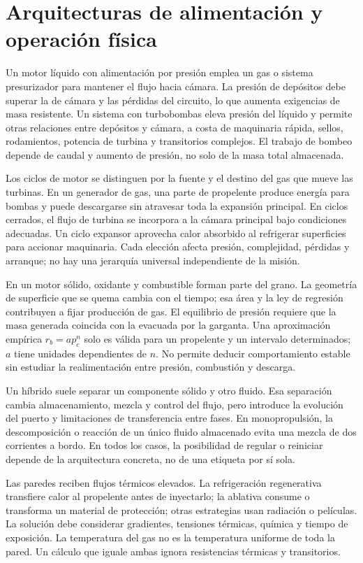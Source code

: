 \section{Arquitecturas de alimentación y operación física}
Un motor líquido con alimentación por presión emplea un gas o sistema presurizador para mantener el flujo hacia cámara. La presión de depósitos debe superar la de cámara y las pérdidas del circuito, lo que aumenta exigencias de masa resistente. Un sistema con turbobombas eleva presión del líquido y permite otras relaciones entre depósitos y cámara, a costa de maquinaria rápida, sellos, rodamientos, potencia de turbina y transitorios complejos. El trabajo de bombeo depende de caudal y aumento de presión, no solo de la masa total almacenada.

Los ciclos de motor se distinguen por la fuente y el destino del gas que mueve las turbinas. En un generador de gas, una parte de propelente produce energía para bombas y puede descargarse sin atravesar toda la expansión principal. En ciclos cerrados, el flujo de turbina se incorpora a la cámara principal bajo condiciones adecuadas. Un ciclo expansor aprovecha calor absorbido al refrigerar superficies para accionar maquinaria. Cada elección afecta presión, complejidad, pérdidas y arranque; no hay una jerarquía universal independiente de la misión.

En un motor sólido, oxidante y combustible forman parte del grano. La geometría de superficie que se quema cambia con el tiempo; esa área y la ley de regresión contribuyen a fijar producción de gas. El equilibrio de presión requiere que la masa generada coincida con la evacuada por la garganta. Una aproximación empírica $r_b=a p_c^n$ solo es válida para un propelente y un intervalo determinados; $a$ tiene unidades dependientes de $n$. No permite deducir comportamiento estable sin estudiar la realimentación entre presión, combustión y descarga.

Un híbrido suele separar un componente sólido y otro fluido. Esa separación cambia almacenamiento, mezcla y control del flujo, pero introduce la evolución del puerto y limitaciones de transferencia entre fases. En monopropulsión, la descomposición o reacción de un único fluido almacenado evita una mezcla de dos corrientes a bordo. En todos los casos, la posibilidad de regular o reiniciar depende de la arquitectura concreta, no de una etiqueta por sí sola.

Las paredes reciben flujos térmicos elevados. La refrigeración regenerativa transfiere calor al propelente antes de inyectarlo; la ablativa consume o transforma un material de protección; otras estrategias usan radiación o películas. La solución debe considerar gradientes, tensiones térmicas, química y tiempo de exposición. La temperatura del gas no es la temperatura uniforme de toda la pared. Un cálculo que iguale ambas ignora resistencias térmicas y transitorios.

